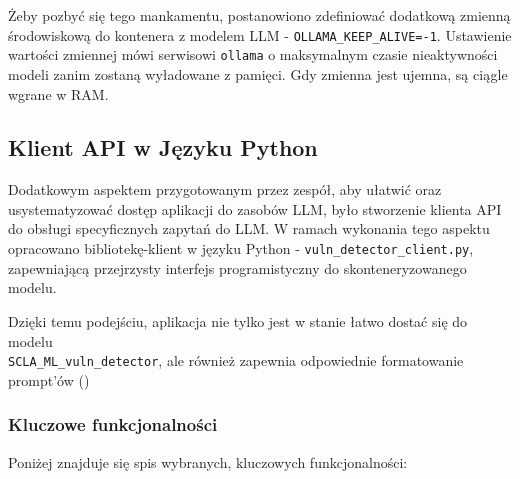 \documentclass[12pt,a4paper]{article}
\begin{document}
Żeby pozbyć się tego mankamentu, postanowiono zdefiniować dodatkową zmienną środowiskową do kontenera z modelem LLM - \texttt{OLLAMA\_KEEP\_ALIVE=-1}.
Ustawienie wartości zmiennej mówi serwisowi \texttt{ollama} o maksymalnym czasie nieaktywności modeli zanim zostaną wyładowane z pamięci. Gdy zmienna 
jest ujemna, są ciągle wgrane w RAM. 


\subsection{Klient API w Języku Python}

Dodatkowym aspektem przygotowanym przez zespół, aby ułatwić oraz usystematyzować dostęp aplikacji do zasobów LLM, było stworzenie klienta API do obsługi specyficznych zapytań
do LLM. W ramach wykonania tego aspektu opracowano bibliotekę-klient w języku Python - \texttt{vuln\_detector\_client.py}, zapewniającą przejrzysty interfejs
programistyczny do skonteneryzowanego modelu. 

Dzięki temu podejściu, aplikacja nie tylko jest w stanie łatwo dostać się do modelu \\\texttt{SCLA\_ML\_vuln\_detector}, ale również zapewnia odpowiednie formatowanie 
prompt'ów ()

\subsubsection{Kluczowe funkcjonalności}

Poniżej znajduje się spis wybranych, kluczowych funkcjonalności:
\end{document}

